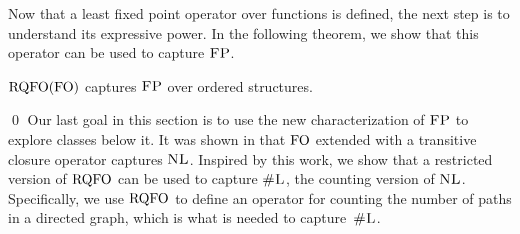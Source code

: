 Now that a least fixed point operator over functions is defined, the next step is to understand its expressive power.
In the following theorem, we show that this operator can be used to capture $\text{\sc FP}$.
\begin{thm} \label{rqfo-fo-cap}
	${\rm RQFO}({\rm FO})$ captures $\text{\sc FP}$ over ordered structures.
\end{thm}
\proof

\qed
Our last goal in this section is to use the new characterization of $\text{\sc FP}$ to explore classes below it.
It was shown in \cite{I86,I88} that ${\rm FO}$ extended with a transitive closure operator captures $\text{\sc NL}$. 
Inspired by this work, we show that a restricted version of ${\rm RQFO}$ can be used to capture $\text{\sc \#L}$, the counting version of $\text{\sc NL}$. 
Specifically, we use ${\rm RQFO}$ to define an operator for counting the number of paths in a directed graph, which is what is needed to capture~$\text{\sc \#L}$.

